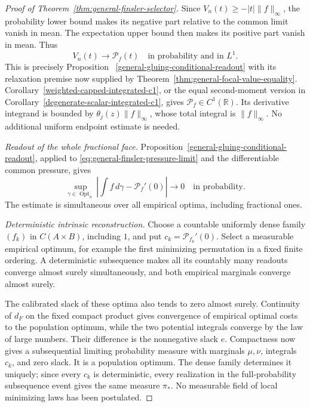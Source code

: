 \documentclass[11pt,reqno]{amsart}
\theoremstyle{definition}
\theoremstyle{remark}
\numberwithin{equation}{section}
\newcommand{\R}{\mathbb R}
\begin{document}
\begin{proof}[Proof of Theorem~\ref{thm:general-finsler-selector}]
Since \(V_n(t)\ge-|t|\|f\|_\infty\), the probability lower bound
makes its negative part relative to the common limit vanish in
mean. The expectation upper bound then makes its positive part
vanish in mean. Thus
\begin{equation}
 V_n(t)\longrightarrow\mathcal P_f(t)
                 \quad\text{in probability and in }L^1.
 \label{eq:general-finsler-pressure-limit}
\end{equation}
This is precisely Proposition~
\ref{general-gluing-conditional-readout} with its relaxation premise
now supplied by Theorem~\ref{thm:general-focal-value-equality}.
Corollary~\ref{weighted-capped-integrated-c1}, or the equal
second-moment version in
Corollary~\ref{degenerate-scalar-integrated-c1}, gives
\(\mathcal P_f\in C^1(\R)\). Its derivative integrand is bounded
by \(\theta_j(z)\|f\|_\infty\), whose total integral is
\(\|f\|_\infty\). No additional uniform endpoint estimate is needed.

\emph{Readout of the whole fractional face.}
Proposition~\ref{general-gluing-conditional-readout}, applied to
\eqref{eq:general-finsler-pressure-limit} and the differentiable
common pressure, gives
\begin{equation}
 \sup_{\gamma\in\operatorname{Opt}_n}
       \left|\int f\,d\gamma-\mathcal P_f'(0)\right|
                   \longrightarrow0\quad\text{in probability}.
 \label{eq:general-finsler-readout}
\end{equation}
The estimate is simultaneous over all empirical optima, including
fractional ones.

\emph{Deterministic intrinsic reconstruction.}
Choose a countable uniformly dense family \((f_k)\) in
\(C(A\times B)\), including \(1\), and put
\(c_k=\mathcal P_{f_k}'(0)\). Select a measurable empirical
optimum, for example the first minimizing permutation in a fixed
finite ordering. A deterministic subsequence makes all its countably
many readouts converge almost surely simultaneously, and both
empirical marginals converge almost surely.

The calibrated slack of these optima also tends to zero almost
surely. Continuity of \(d_F\) on the fixed compact product gives
convergence of empirical optimal costs to the population optimum,
while the two potential integrals converge by the law of large
numbers. Their difference is the nonnegative slack \(e\).
Compactness now gives a subsequential limiting probability measure
with marginals \(\mu,\nu\), integrals \(c_k\), and zero slack.
It is a population optimum. The dense family determines it uniquely;
since every \(c_k\) is deterministic, every realization in the
full-probability subsequence event gives the same measure \(\pi_*\).
No measurable field of local minimizing laws has been postulated.


\end{proof}
\end{document}
